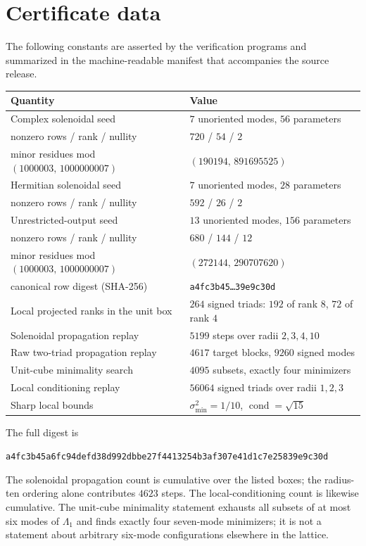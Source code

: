 \documentclass[11pt]{article}
\theoremstyle{definition}
\theoremstyle{remark}
\theoremstyle{plain}
\DeclareMathOperator{\cond}{cond}
\begin{document}
\appendix

\section{Certificate data}
\label{app:certificates}

The following constants are asserted by the verification programs and
summarized in the machine-readable manifest that accompanies the source
release.

\begin{center}
\small
\begin{tabular}{ll}
\hline
Quantity & Value\\
\hline
Complex solenoidal seed & $7$ unoriented modes, $56$ parameters\\
\quad nonzero rows / rank / nullity & $720$ / $54$ / $2$\\
\quad minor residues mod $(1000003,\,1000000007)$
 & $(190194,\,891695525)$\\
Hermitian solenoidal seed & $7$ unoriented modes, $28$ parameters\\
\quad nonzero rows / rank / nullity & $592$ / $26$ / $2$\\
Unrestricted-output seed & $13$ unoriented modes, $156$ parameters\\
\quad nonzero rows / rank / nullity & $680$ / $144$ / $12$\\
\quad minor residues mod $(1000003,\,1000000007)$
 & $(272144,\,290707620)$\\
\quad canonical row digest (SHA-256)
 & \texttt{a4fc3b45\dots39e9c30d}\\
Local projected ranks in the unit box
 & $264$ signed triads: $192$ of rank $8$, $72$ of rank $4$\\
Solenoidal propagation replay
 & $5199$ steps over radii $2,3,4,10$\\
Raw two-triad propagation replay
 & $4617$ target blocks, $9260$ signed modes\\
Unit-cube minimality search & $4095$ subsets, exactly four minimizers\\
Local conditioning replay & $56064$ signed triads over radii $1,2,3$\\
Sharp local bounds
 & $\sigma_{\min}^{2}=1/10$, $\cond=\sqrt{15}$\\
\hline
\end{tabular}
\normalsize
\end{center}

The full digest is
\begin{center}
\texttt{a4fc3b45a6fc94defd38d992dbbe27f4413254b3af307e41d1c7e25839e9c30d}
\end{center}
The solenoidal propagation count is cumulative over the listed boxes; the
radius-ten ordering alone contributes $4623$ steps. The local-conditioning
count is likewise cumulative. The unit-cube minimality statement exhausts all
subsets of at most six modes of $\Lambda_{1}$ and finds exactly four
seven-mode minimizers; it is not a statement about arbitrary six-mode
configurations elsewhere in the lattice.
\end{document}
